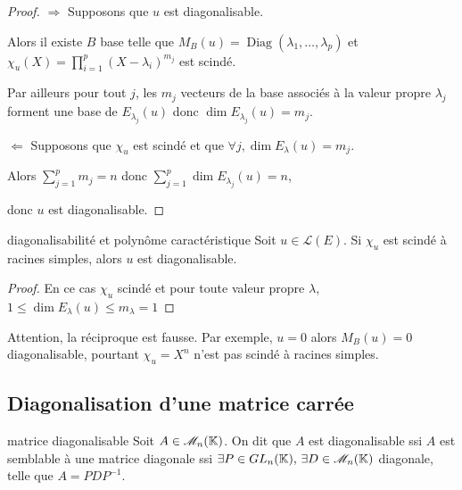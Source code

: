 \begin{proof}
    $\Rightarrow$ Supposons que $u$ est diagonalisable.

    Alors il existe $B$ base telle que $M_B(u) = \operatorname{Diag}(\lambda_1, \ldots, \lambda_p)$
    et $\displaystyle \chi_u(X) = \prod_{i = 1 }^{ p } (X - \lambda_i)^{m_j}$ est scindé. 

    Par ailleurs pour tout $j$, les $m_j$ vecteurs de la base associés à la valeur propre $\lambda_j$
    forment une base de $E_{\lambda_j}(u)$ donc $\dim E_{\lambda_j}(u) = m_j$. 

    \lvspace $\Leftarrow$ Supposons que $\chi_u$ est scindé et que $\forall j, \dim E_\lambda(u) = m_j$.

    Alors $\displaystyle \sum_{j = 1 }^{ p } m_j = n$ donc $\displaystyle \sum_{j = 1 }^{ p } \dim E_{\lambda_j}(u) = n$, 

    donc $u$ est diagonalisable.
\end{proof}


\begin{proposition}{diagonalisabilité et polynôme caractéristique}{}
    Soit $u \in \mathscr L(E)$. Si $\chi_u$ est scindé à racines simples, alors $u$ est diagonalisable.
\end{proposition}

\begin{proof}
    En ce cas $\chi_u$ scindé et pour toute valeur propre $\lambda$, $1 \leqslant \dim E_\lambda(u) \leqslant m_\lambda = 1$
\end{proof}

\begin{remarque}
    Attention, la réciproque est fausse. Par exemple, $u = 0$ alors $M_B(u) = 0$ diagonalisable, pourtant 
    $\chi_u = X^n$ n'est pas scindé à racines simples.
\end{remarque}

\subsection{Diagonalisation d'une matrice carrée }

\begin{definition}{matrice diagonalisable}{}
    Soit $A \in \mathscr M_n(\mathbb{K})$. On dit que $A$ est diagonalisable ssi $A$ est semblable à une matrice diagonale
    ssi $\exists P \in GL_n(\mathbb{K}), \, \exists D \in \mathscr M_n(\mathbb{K})$ diagonale, telle que $A = P D P^{-1}$.
\end{definition}

